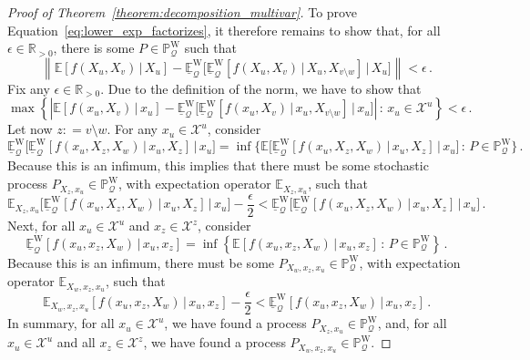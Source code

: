 \documentclass[10pt]{paper}
\theoremstyle{definition}
\newcommand{\reals}{\mathbb{R}}
\newcommand{\realspos}{\reals_{>0}}
\newcommand{\states}{\mathcal{X}}
\newcommand{\processes}{\mathbb{P}}
\newcommand{\wprocesses}{\processes^{\mathrm{W}}}
\newcommand{\rateset}{\mathcal{Q}}
\newcommand{\norm}[1]{\left\lVert #1 \right\rVert}
\newcommand{\abs}[1]{\left\vert #1 \right\vert}
\newcommand{\coloneqq}{:\!=}
\begin{document}
\begin{proof}[Proof of Theorem~\ref{theorem:decomposition_multivar}]
To prove Equation~\eqref{eq:lower_exp_factorizes}, it therefore remains to show that, for all $\epsilon\in\realspos$, there is some $P\in\wprocesses_\rateset$ such that
\begin{equation*}
\norm{\mathbb{E}\left[f(X_u,X_v)\,\vert\,X_u\right] - \underline{\mathbb{E}}^{\mathrm{W}}_\rateset\bigl[\underline{\mathbb{E}}^{\mathrm{W}}_\rateset\left[f(X_u,X_v)\,\vert\,X_u,X_{v\setminus w}\right]\,\vert\,X_u\bigr]} < \epsilon\,.
\end{equation*}
Fix any $\epsilon\in\realspos$. Due to the definition of the norm, we have to show that
\begin{equation*}
\max\left\{\abs{\mathbb{E}\left[f(x_u,X_v)\,\vert\,x_u\right] - \underline{\mathbb{E}}^{\mathrm{W}}_\rateset\bigl[\underline{\mathbb{E}}^{\mathrm{W}}_\rateset\left[f(x_u,X_v)\,\vert\,x_u,X_{v\setminus w}\right]\,\vert\,x_u\bigr]}\,:\,x_u\in\states^u\right\} < \epsilon\,.
\end{equation*}
Let now $z\coloneqq v\setminus w$. For any $x_u\in\states^u$, consider
\begin{equation*}
\underline{\mathbb{E}}^{\mathrm{W}}_\rateset\bigl[\underline{\mathbb{E}}^{\mathrm{W}}_\rateset[f(x_u,X_z,X_w)\,\vert\,x_u,X_z]\,\big\vert\,x_u\bigr] = \inf\{\mathbb{E}\bigl[\underline{\mathbb{E}}^{\mathrm{W}}_\rateset[f(x_u,X_z,X_w)\,\vert\,x_u,X_z]\,\big\vert\,x_u\bigr]\,:\,P\in\wprocesses_\rateset\}\,.
\end{equation*}
Because this is an infimum, this implies that there must be some stochastic process $P_{X_z,x_u}\in\wprocesses_\rateset$, with expectation operator $\mathbb{E}_{X_z,x_u}$, such that
\begin{equation*}
\mathbb{E}_{X_z,x_u}\bigl[\underline{\mathbb{E}}^{\mathrm{W}}_\rateset[f(x_u,X_z,X_w)\,\vert\,x_u,X_z]\,\big\vert\,x_u\bigr] - \frac{\epsilon}{2} < \underline{\mathbb{E}}^{\mathrm{W}}_\rateset\bigl[\underline{\mathbb{E}}^{\mathrm{W}}_\rateset[f(x_u,X_z,X_w)\,\vert\,x_u,X_z]\,\big\vert\,x_u\bigr]\,.
\end{equation*}
Next, for all $x_u\in\states^u$ and $x_{z}\in\states^z$, consider
\begin{equation*}
\underline{\mathbb{E}}^{\mathrm{W}}_\rateset\left[f(x_u,x_z,X_w)\,\vert\,x_u,x_z\right] = \inf\left\{\mathbb{E}\left[f(x_u,x_z,X_w)\,\vert\,x_u,x_z\right] \,:\, P\in\wprocesses_\rateset\right\}\,.
\end{equation*}
Because this is an infimum, there must be some $P_{X_w,x_z,x_u}\in\wprocesses_\rateset$, with expectation operator $\mathbb{E}_{X_w,x_z,x_u}$, such that
\begin{equation*}
\mathbb{E}_{X_w,x_z,x_u}\left[f(x_u,x_z,X_w)\,\vert\,x_u,x_z\right] - \frac{\epsilon}{2} < \underline{\mathbb{E}}^{\mathrm{W}}_\rateset\left[f(x_u,x_z,X_w)\,\vert\,x_u,x_z\right]\,.
\end{equation*}
In summary, for all $x_u\in\states^u$, we have found a process $P_{X_z,x_u}\in\wprocesses_\rateset$, and, for all $x_u\in\states^u$ and all $x_z\in\states^z$, we have found a process $P_{X_w,x_z,x_u}\in\wprocesses_\rateset$.


\end{proof}
\end{document}
